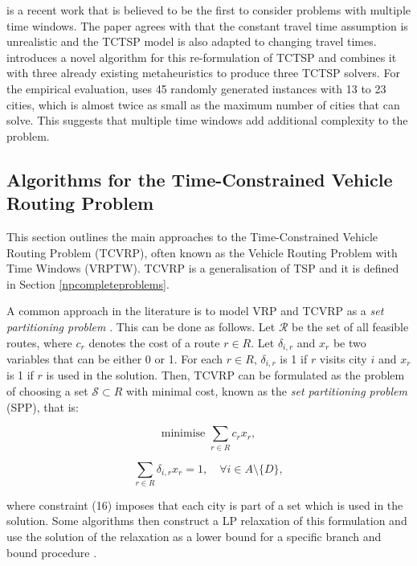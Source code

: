\documentclass{mprop}
\theoremstyle{definition}
\begin{document}
\citet{Hurkala15} is a recent work that is believed to be the first to consider problems with multiple time windows. The paper agrees with \citet{ariglianotime} that the constant travel time assumption is unrealistic and the TCTSP model is also adapted to changing travel times. \citet{Hurkala15} introduces a novel algorithm for this re-formulation of TCTSP and combines it with three already existing metaheuristics to produce three TCTSP solvers. For the empirical evaluation, \citet{Hurkala15} uses 45 randomly generated instances with 13 to 23 cities, which is almost twice as small as the maximum number of cities that \citet{ariglianotime} can solve. This suggests that multiple time windows add additional complexity to the problem.

\subsection{Algorithms for the Time-Constrained Vehicle Routing Problem}
\label{sec:tcvrpalgos}
This section outlines the main approaches to the Time-Constrained Vehicle Routing Problem (TCVRP), often known as the Vehicle Routing Problem with Time Windows (VRPTW). TCVRP is a generalisation of TSP and it is defined in Section \ref{npcompleteproblems}.

A common approach in the literature is to model VRP and TCVRP as a \textit{set partitioning problem} \citep{Desrochers92,Agarwal89,Desrosiers84,Alvarenga07}. This can be done as follows. Let $\mathcal{R}$ be the set of all feasible routes, where $c_{r}$ denotes the cost of a route $r \in R$. Let $\delta_{i,r}$ and $x_{r}$ be two variables that can be either 0 or 1. For each $r \in R$, $\delta_{i,r}$ is 1 if $r$ visits city $i$ and $x_{r}$ is 1 if $r$ is used in the solution. Then, TCVRP can be formulated as the problem of choosing a set $\mathcal{S} \subset R$ with minimal cost, known as the \textit{set partitioning problem} (SPP), that is:

\begin{equation}
\label{eq:tcvrpobjfunc}
\textrm{minimise } \sum_{r \in R} c_{r} x_{r},
\end{equation}

\begin{equation}
\label{eq:tcvrpconstraint1}
\sum_{r \in R} \delta_{i,r} x_{r} = 1, \quad \forall i \in A \setminus \{D\},
\end{equation}

where constraint (16) imposes that each city is part of a set which is used in the solution. Some algorithms then construct a LP relaxation of this formulation and use the solution of the relaxation as a lower bound for a specific branch and bound procedure \citep{Desrochers92,Agarwal89}.
\end{document}
